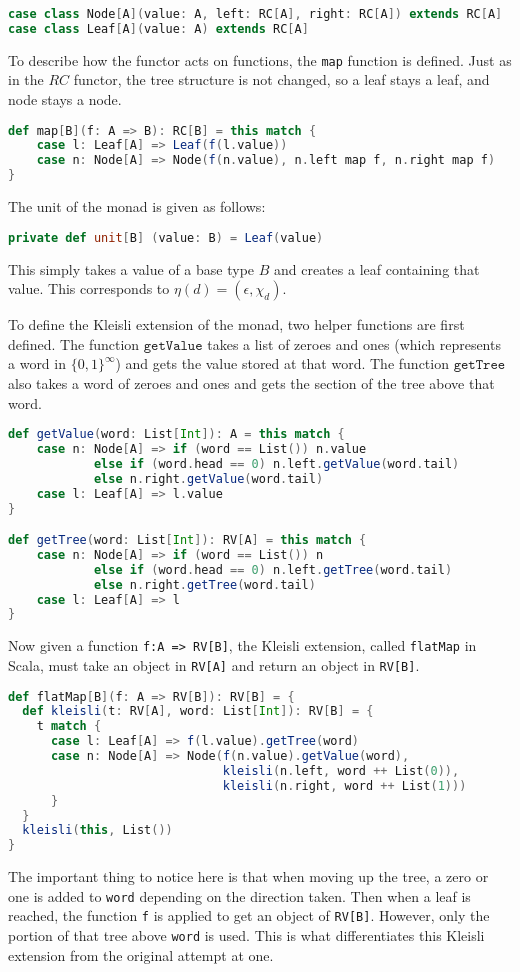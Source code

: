 \begin{lstlisting}[language=Scala]
case class Node[A](value: A, left: RC[A], right: RC[A]) extends RC[A]
case class Leaf[A](value: A) extends RC[A]
\end{lstlisting}

To describe how the functor acts on functions, the \texttt{map} function is defined.  Just as in the $RC$ functor, the tree structure is not changed, so a leaf stays a leaf, and node stays a node.
\begin{lstlisting}[language=Scala]
def map[B](f: A => B): RC[B] = this match {
    case l: Leaf[A] => Leaf(f(l.value))
    case n: Node[A] => Node(f(n.value), n.left map f, n.right map f)
}
\end{lstlisting}
The unit of the monad is given as follows:
\begin{lstlisting}[language=Scala]
private def unit[B] (value: B) = Leaf(value)
\end{lstlisting}
This simply takes a value of a base type $B$ and creates a leaf containing that value.  This corresponds to $\eta(d) = (\epsilon, \chi_d)$.

To define the Kleisli extension of the monad, two helper functions are first defined.  The function $\texttt{getValue}$ takes a list of zeroes and ones (which represents a word in $\{0,1\}^\infty$) and gets the value stored at that word.  The function $\texttt{getTree}$ also takes a word of zeroes and ones and gets the section of the tree above that word.

\begin{lstlisting}[language=Scala]
def getValue(word: List[Int]): A = this match {
    case n: Node[A] => if (word == List()) n.value
            else if (word.head == 0) n.left.getValue(word.tail)
            else n.right.getValue(word.tail)
    case l: Leaf[A] => l.value
}

def getTree(word: List[Int]): RV[A] = this match {
    case n: Node[A] => if (word == List()) n
            else if (word.head == 0) n.left.getTree(word.tail)
            else n.right.getTree(word.tail)
    case l: Leaf[A] => l
}
\end{lstlisting}
Now given a function \texttt{f:A => RV[B]}, the Kleisli extension, called \texttt{flatMap} in Scala, must take an object in \texttt{RV[A]} and return an object in \texttt{RV[B]}.

\begin{lstlisting}[language=Scala]
def flatMap[B](f: A => RV[B]): RV[B] = {
  def kleisli(t: RV[A], word: List[Int]): RV[B] = {
    t match {
      case l: Leaf[A] => f(l.value).getTree(word)
      case n: Node[A] => Node(f(n.value).getValue(word),  
                              kleisli(n.left, word ++ List(0)),
                              kleisli(n.right, word ++ List(1)))
      }
  }
  kleisli(this, List())
}
\end{lstlisting}
The important thing to notice here is that when moving up the tree, a zero or one is added to \texttt{word} depending on the direction taken.  Then when a leaf is reached, the function \texttt{f} is applied to get an object of \texttt{RV[B]}.  However, only the portion of that tree above \texttt{word} is used.  This is what differentiates this Kleisli extension from the original attempt at one.

